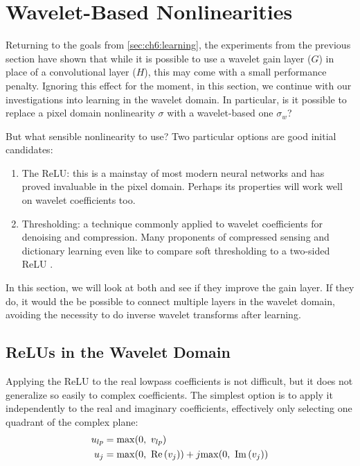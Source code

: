 \section{Wavelet-Based Nonlinearities}\label{sec:ch6:nonlinearities}
Returning to the goals from \autoref{sec:ch6:learning}, the experiments from the
previous section have shown that while it is possible to use a wavelet gain
layer ($G$) in place of a convolutional layer ($H$), this may come with a small
performance penalty. Ignoring this effect for the moment, in this section, we
continue with our investigations into learning in the wavelet domain. In
particular, is it possible to replace a pixel domain nonlinearity $\sigma$ with
a wavelet-based one $\sigma_w$?

But what sensible nonlinearity to use? Two particular options are good initial
candidates:
\begin{enumerate}
  \item The ReLU: this is a mainstay of most modern neural networks and has
    proved invaluable in the pixel domain. Perhaps its properties
    will work well on wavelet coefficients too.
  \item Thresholding: a technique commonly applied to wavelet
    coefficients for denoising and compression. Many proponents of compressed
    sensing and dictionary learning even like to compare soft thresholding to a
    two-sided ReLU \cite{papyan_theoretical_2018, papyan_convolutional_2016}.
\end{enumerate}

In this section, we will look at both and see if they improve the gain
layer. If they do, it would the be possible to connect multiple layers in the
wavelet domain, avoiding the necessity to do inverse wavelet transforms after
learning.

\subsection{ReLUs in the Wavelet Domain}
Applying the ReLU to the real lowpass coefficients is not difficult, but it does
not generalize so easily to complex coefficients. The simplest option is to apply
it independently to the real and imaginary coefficients, effectively only
selecting one quadrant of the complex plane:
\begin{align}
  u_{lp} &= \mathrm{max}(0,\ v_{lp}) \\
  u_{j} &= \mathrm{max}(0,\ \mathrm{Re}\left(v_{j}\right)) + j\mathrm{max}(0,\ \mathrm{Im}\left(v_j\right)) \label{eq:ch6:relu_bp}
\end{align}

